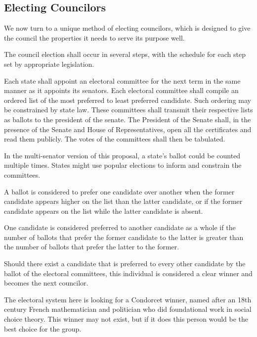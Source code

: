 \documentclass{article}
\begin{document}
\subsection{Electing Councilors}

We now turn to a unique method of electing councilors, which is designed to give the council the properties it needs to serve its purpose well.

\begin{quoting}
The council election shall occur in several steps, with the schedule for each step set by appropriate legislation.

Each state shall appoint an electoral committee for the next term in the same manner as it appoints its senators. Each electoral committee shall compile an ordered list of the most preferred to least preferred candidate. Such ordering may be constrained by state law. These committees shall transmit their respective lists as ballots to the president of the senate.  The President of the Senate shall, in the presence of the Senate and House of Representatives, open all the certificates and read them publicly. The votes of the committees shall then be tabulated.
\end{quoting}

In the multi-senator version of this proposal, a state's ballot could be counted multiple times. States might use popular elections to inform and constrain the committees.

\begin{quoting}
A ballot is considered to prefer one candidate over another when the former candidate appears higher on the list than the latter candidate, or if the former candidate appears on the list while the latter candidate is absent.

One candidate is considered preferred to another candidate as a whole if the number of ballots that prefer the former candidate to the latter is greater than the number of ballots that prefer the latter to the former.

Should there exist a candidate that is preferred to every other candidate by the ballot of the electoral committees, this individual is considered a clear winner and becomes the next councilor.
\end{quoting}

The electoral system here is looking for a Condorcet winner, named after an 18th century French mathematician and politician who did foundational work in social choice theory. This winner may not exist, but if it does this person would be the best choice for the group.
\end{document}
